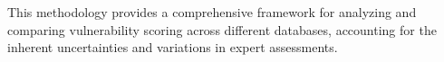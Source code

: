 \documentclass[12pt]{article}
\begin{document}
This methodology provides a comprehensive framework for analyzing and comparing vulnerability
scoring across different databases, accounting for the inherent uncertainties and variations in
expert assessments.







\end{document}
